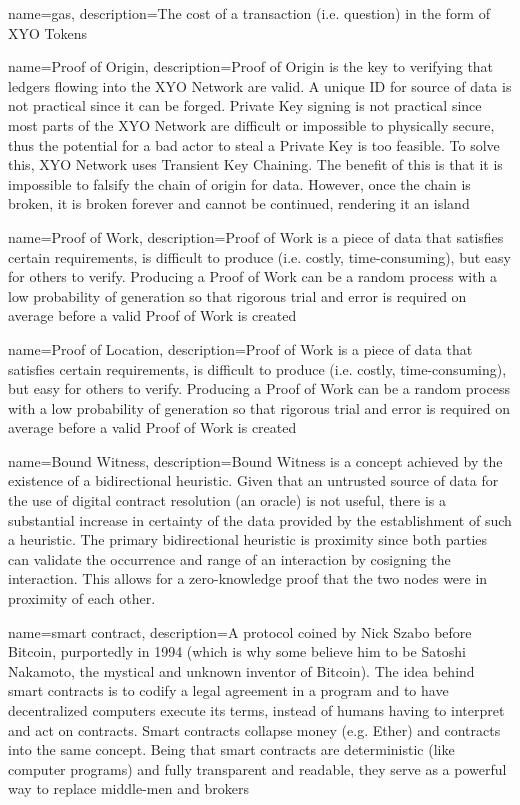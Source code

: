 \documentclass{article}
\begin{document}
{
    name={gas},
    description={The cost of a transaction (i.e. question) in the form of XYO Tokens}
}

{
    name={Proof of Origin},
    description={Proof of Origin is the key to verifying that ledgers flowing into the XYO Network are valid. A unique ID for source of data is not practical since it can be forged. Private Key signing is not practical since most parts of the XYO Network are difficult or impossible to physically secure, thus the potential for a bad actor to steal a Private Key is too feasible. To solve this, XYO Network uses Transient Key Chaining. The benefit of this is that it is impossible to falsify the chain of origin for data. However, once the chain is broken, it is broken forever and cannot be continued, rendering it an island}
}

{
    name={Proof of Work},
    description={Proof of Work is a piece of data that satisfies certain requirements, is difficult to produce (i.e. costly, time-consuming), but easy for others to verify. Producing a Proof of Work can be a random process with a low probability of generation so that rigorous trial and error is required on average before a valid Proof of Work is created}
}

{
    name={Proof of Location},
    description={Proof of Work is a piece of data that satisfies certain requirements, is difficult to produce (i.e. costly, time-consuming), but easy for others to verify. Producing a Proof of Work can be a random process with a low probability of generation so that rigorous trial and error is required on average before a valid Proof of Work is created}
}

{
    name={Bound Witness},
    description={Bound Witness is a concept achieved by the existence of a bidirectional heuristic. Given that an untrusted source of data for the use of digital contract resolution (an oracle) is not useful, there is a substantial increase in certainty of the data provided by the establishment of such a heuristic. The primary bidirectional heuristic is proximity since both parties can validate the occurrence and range of an interaction by cosigning the interaction. This allows for a zero-knowledge proof that the two nodes were in proximity of each other.}
}

{
    name={smart contract},
    description={A protocol coined by Nick Szabo before Bitcoin, purportedly in 1994 (which is why some believe him to be Satoshi Nakamoto, the mystical and unknown inventor of Bitcoin). The idea behind smart contracts is to codify a legal agreement in a program and to have decentralized computers execute its terms, instead of humans having to interpret and act on contracts. Smart contracts collapse money (e.g. Ether) and contracts into the same concept. Being that smart contracts are deterministic (like computer programs) and fully transparent and readable, they serve as a powerful way to replace middle-men and brokers}
}
\end{document}
